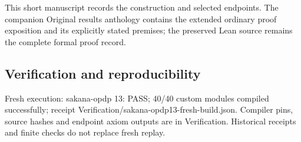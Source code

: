 \documentclass[11pt,a4paper]{article}
\begin{document}
{\small This short manuscript records the construction and selected endpoints. The companion Original results anthology contains the extended ordinary proof exposition and its explicitly stated premises; the preserved Lean source remains the complete formal proof record.\par}

\subsection{Verification and reproducibility}
Fresh execution: sakana-opdp 13: PASS; 40/40 custom modules compiled successfully; receipt Verification/sakana-opdp13-fresh-build.json. Compiler pins, source hashes and endpoint axiom outputs are in Verification. Historical receipts and finite checks do not replace fresh replay.
\end{document}
